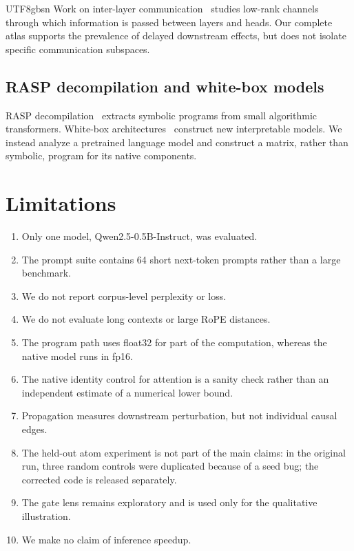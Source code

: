 \documentclass[11pt]{article}
\providecommand{\tightlist}{\setlength{\itemsep}{0pt}\setlength{\parskip}{0pt}}
\begin{document}
\begin{CJK*}{UTF8}{gbsn}
Work on inter-layer communication~\citep{merullo2024talking} studies low-rank channels through
which information is passed between layers and heads. Our complete atlas
supports the prevalence of delayed downstream effects, but does not
isolate specific communication subspaces.

\subsection{RASP decompilation and white-box
models}

RASP decompilation~\citep{huang2026rasp} extracts symbolic programs from small algorithmic
transformers. White-box architectures~\citep{yu2023whitebox} construct new interpretable
models. We instead analyze a pretrained language model and construct a
matrix, rather than symbolic, program for its native components.

\section{Limitations}

\begin{enumerate}
\def\labelenumi{\arabic{enumi}.}
\tightlist
\item
  Only one model, Qwen2.5-0.5B-Instruct, was evaluated.
\item
  The prompt suite contains 64 short next-token prompts rather than a
  large benchmark.
\item
  We do not report corpus-level perplexity or loss.
\item
  We do not evaluate long contexts or large RoPE distances.
\item
  The program path uses float32 for part of the computation, whereas the
  native model runs in fp16.
\item
  The native identity control for attention is a sanity check rather
  than an independent estimate of a numerical lower bound.
\item
  Propagation measures downstream perturbation, but not individual
  causal edges.
\item
  The held-out atom experiment is not part of the main claims: in the
  original run, three random controls were duplicated because of a seed
  bug; the corrected code is released separately.
\item
  The gate lens remains exploratory and is used only for the qualitative
  illustration.
\item
  We make no claim of inference speedup.
\end{enumerate}


\end{CJK*}
\end{document}
